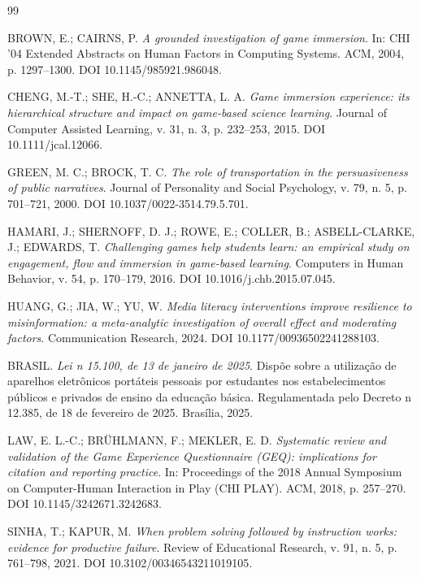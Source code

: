 \documentclass[11pt,a4paper]{article}
\begin{document}
\begin{thebibliography}{99}
\small

BROWN, E.; CAIRNS, P.
\emph{A grounded investigation of game immersion}.
In: CHI '04 Extended Abstracts on Human Factors in Computing Systems. ACM, 2004, p. 1297--1300.
DOI 10.1145/985921.986048.

CHENG, M.-T.; SHE, H.-C.; ANNETTA, L. A.
\emph{Game immersion experience: its hierarchical structure and impact on game-based science
learning}.
Journal of Computer Assisted Learning, v. 31, n. 3, p. 232--253, 2015.
DOI 10.1111/jcal.12066.

GREEN, M. C.; BROCK, T. C.
\emph{The role of transportation in the persuasiveness of public narratives}.
Journal of Personality and Social Psychology, v. 79, n. 5, p. 701--721, 2000.
DOI 10.1037/0022-3514.79.5.701.

HAMARI, J.; SHERNOFF, D. J.; ROWE, E.; COLLER, B.; ASBELL-CLARKE, J.; EDWARDS, T.
\emph{Challenging games help students learn: an empirical study on engagement, flow and immersion
in game-based learning}.
Computers in Human Behavior, v. 54, p. 170--179, 2016.
DOI 10.1016/j.chb.2015.07.045.

HUANG, G.; JIA, W.; YU, W.
\emph{Media literacy interventions improve resilience to misinformation: a meta-analytic
investigation of overall effect and moderating factors}.
Communication Research, 2024.
DOI 10.1177/00936502241288103.

BRASIL.
\emph{Lei n\textordmasculine{} 15.100, de 13 de janeiro de 2025}. Disp\~oe sobre a utiliza\c{c}\~ao
de aparelhos eletr\^onicos port\'ateis pessoais por estudantes nos estabelecimentos p\'ublicos e
privados de ensino da educa\c{c}\~ao b\'asica. Regulamentada pelo Decreto n\textordmasculine{}
12.385, de 18 de fevereiro de 2025. Bras\'ilia, 2025.

LAW, E. L.-C.; BR\"UHLMANN, F.; MEKLER, E. D.
\emph{Systematic review and validation of the Game Experience Questionnaire (GEQ): implications
for citation and reporting practice}.
In: Proceedings of the 2018 Annual Symposium on Computer-Human Interaction in Play (CHI PLAY).
ACM, 2018, p. 257--270.
DOI 10.1145/3242671.3242683.

SINHA, T.; KAPUR, M.
\emph{When problem solving followed by instruction works: evidence for productive failure}.
Review of Educational Research, v. 91, n. 5, p. 761--798, 2021.
DOI 10.3102/00346543211019105.


\end{thebibliography}
\end{document}
